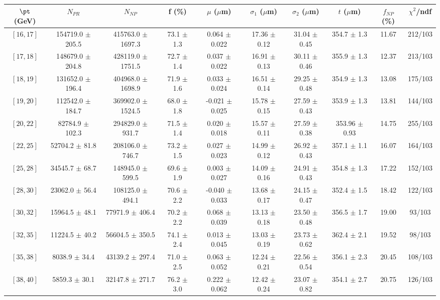 \begin{tabular}{c||c|c|c|c|c|c|c||c|c}
$\pt$ (GeV) & $N_{PR}$ & $N_{NP}$ & f (\%) & $\mu$ ($\mu$m) & $\sigma_1$ ($\mu$m) & $\sigma_2$ ($\mu$m)  & $t$ ($\mu$m) & $f_{NP}$ (\%) & $\chi^2$/ndf \\
\hline
$[16, 17]$ & 154719.0 $\pm$ 205.5 & 415763.0 $\pm$ 1697.3 & 73.1 $\pm$ 1.3 & 0.064 $\pm$ 0.022 & 17.36 $\pm$ 0.12 & 31.04 $\pm$ 0.45 & 354.7 $\pm$ 1.3 & 11.67 & 212/103\\
$[17, 18]$ & 148679.0 $\pm$ 204.8 & 428119.0 $\pm$ 1751.5 & 72.7 $\pm$ 1.4 & 0.037 $\pm$ 0.022 & 16.91 $\pm$ 0.13 & 30.11 $\pm$ 0.46 & 355.9 $\pm$ 1.3 & 12.37 & 213/103\\
$[18, 19]$ & 131652.0 $\pm$ 196.4 & 404968.0 $\pm$ 1698.9 & 71.9 $\pm$ 1.6 & 0.033 $\pm$ 0.024 & 16.51 $\pm$ 0.14 & 29.25 $\pm$ 0.48 & 354.9 $\pm$ 1.3 & 13.08 & 175/103\\
$[19, 20]$ & 112542.0 $\pm$ 184.7 & 369902.0 $\pm$ 1524.5 & 68.0 $\pm$ 1.8 & -0.021 $\pm$ 0.025 & 15.78 $\pm$ 0.15 & 27.59 $\pm$ 0.43 & 353.9 $\pm$ 1.3 & 13.81 & 144/103\\
$[20, 22]$ & 82784.9 $\pm$ 102.3 & 294829.0 $\pm$ 931.7 & 71.5 $\pm$ 1.4 & 0.020 $\pm$ 0.018 & 15.57 $\pm$ 0.11 & 27.59 $\pm$ 0.38 & 353.96 $\pm$ 0.93 & 14.75 & 255/103\\
$[22, 25]$ & 52704.2 $\pm$ 81.8 & 208106.0 $\pm$ 746.7 & 73.2 $\pm$ 1.5 & 0.027 $\pm$ 0.023 & 14.99 $\pm$ 0.12 & 26.92 $\pm$ 0.43 & 357.1 $\pm$ 1.1 & 16.07 & 164/103\\
$[25, 28]$ & 34545.7 $\pm$ 68.7 & 148945.0 $\pm$ 599.5 & 69.6 $\pm$ 1.9 & 0.003 $\pm$ 0.027 & 14.09 $\pm$ 0.16 & 24.91 $\pm$ 0.43 & 354.8 $\pm$ 1.3 & 17.22 & 152/103\\
$[28, 30]$ & 23062.0 $\pm$ 56.4 & 108125.0 $\pm$ 494.1 & 70.6 $\pm$ 2.2 & -0.040 $\pm$ 0.033 & 13.68 $\pm$ 0.17 & 24.15 $\pm$ 0.47 & 352.4 $\pm$ 1.5 & 18.42 & 122/103\\
$[30, 32]$ & 15964.5 $\pm$ 48.1 & 77971.9 $\pm$ 406.4 & 70.2 $\pm$ 2.2 & 0.068 $\pm$ 0.039 & 13.13 $\pm$ 0.18 & 23.50 $\pm$ 0.48 & 356.5 $\pm$ 1.7 & 19.00 & 93/103\\
$[32, 35]$ & 11224.5 $\pm$ 40.2 & 56604.5 $\pm$ 350.5 & 74.1 $\pm$ 2.4 & 0.013 $\pm$ 0.045 & 13.03 $\pm$ 0.19 & 23.73 $\pm$ 0.62 & 362.4 $\pm$ 2.1 & 19.52 & 98/103\\
$[35, 38]$ & 8038.9 $\pm$ 34.4 & 43139.2 $\pm$ 297.4 & 71.0 $\pm$ 2.5 & 0.063 $\pm$ 0.052 & 12.24 $\pm$ 0.21 & 22.56 $\pm$ 0.54 & 356.1 $\pm$ 2.3 & 20.45 & 108/103\\
$[38, 40]$ & 5859.3 $\pm$ 30.1 & 32147.8 $\pm$ 271.7 & 76.2 $\pm$ 3.0 & 0.222 $\pm$ 0.062 & 12.42 $\pm$ 0.24 & 23.07 $\pm$ 0.82 & 354.1 $\pm$ 2.7 & 20.75 & 126/103\\

\end{tabular}
